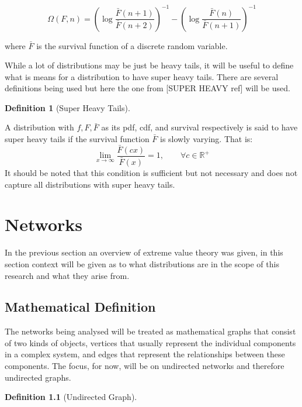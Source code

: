 \documentclass[
  10pt,
  a4paper,
]{scrreprt}
\theoremstyle{definition}
\newtheorem{definition}{Definition}[section]
\theoremstyle{remark}
\begin{document}
{\[
\Omega(F,n) = \left(\log\frac{\bar F(n+1)}{\bar F(n+2)}\right)^{-1} -\left(\log\frac{\bar F(n)}{\bar F(n+1)}\right)^{-1}
\]

where \(\bar F\) is the survival function of a discrete random variable.

While a lot of distributions may be just be heavy tails, it will be
useful to define what is means for a distribution to have super heavy
tails. There are several definitions being used but here the one from
{[}SUPER HEAVY ref{]} will be used.

\begin{definition}[Super Heavy
Tails]\protect\hypertarget{def-superheavy}{}\label{def-superheavy}

A distribution with \(f,F,\bar F\) as its pdf, cdf, and survival
respectively is said to have super heavy tails if the survival function
\(\bar F\) is slowly varying. That is: \[
\lim_{x\rightarrow\infty}\frac{\bar F(cx)}{\bar F(x)} = 1, \qquad\forall c \in \mathbb{R^+} 
\] It should be noted that this condition is sufficient but not
necessary and does not capture all distributions with super heavy tails.

\end{definition}

\hypertarget{networks}{%
\chapter{Networks}\label{networks}}

In the previous section an overview of extreme value theory was given,
in this section context will be given as to what distributions are in
the scope of this research and what they arise from.

\hypertarget{mathematical-definition}{%
\section{Mathematical Definition}\label{mathematical-definition}}

The networks being analysed will be treated as mathematical graphs that
consist of two kinds of objects, vertices that usually represent the
individual components in a complex system, and edges that represent the
relationships between these components. The focus, for now, will be on
undirected networks and therefore undirected graphs.

\begin{definition}[Undirected
Graph]\protect\hypertarget{def-graph}{}\label{def-graph}


\end{definition}}
\end{document}
